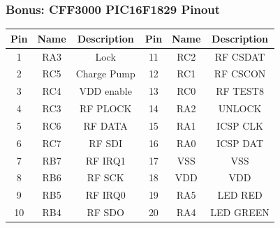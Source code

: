 \documentclass[aspectratio=169]{beamer}
\begin{document}
\begin{frame}
	\frametitle{Bonus: CFF3000 PIC16F1829 Pinout}

	\begin{center}
		\begin{tabular}{|c|c|c||c|c|c|}
			\hline
			Pin & Name & Description & Pin & Name & Description\\
			\hline
			 1 & RA3 & Lock        & 11 & RC2 & RF CSDAT\\
			 2 & RC5 & Charge Pump & 12 & RC1 & RF CSCON\\
			 3 & RC4 & VDD enable  & 13 & RC0 & RF TEST8\\
			 4 & RC3 & RF PLOCK    & 14 & RA2 & UNLOCK\\
			 5 & RC6 & RF DATA     & 15 & RA1 & ICSP CLK\\
			 6 & RC7 & RF SDI      & 16 & RA0 & ICSP DAT\\
			 7 & RB7 & RF IRQ1     & 17 & VSS & VSS\\
			 8 & RB6 & RF SCK      & 18 & VDD & VDD\\
			 9 & RB5 & RF IRQ0     & 19 & RA5 & LED RED\\
			10 & RB4 & RF SDO      & 20 & RA4 & LED GREEN\\
			\hline
		\end{tabular}
	\end{center}
\end{frame}
\end{document}
